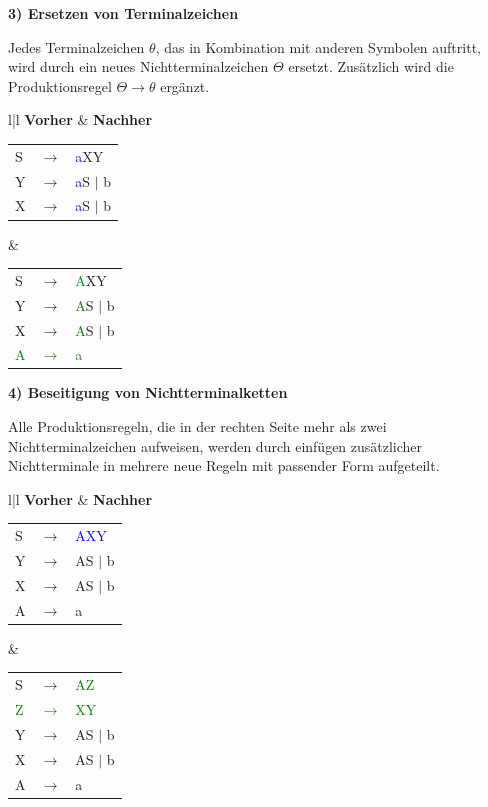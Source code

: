 \begin{teile}
	\textbf{3) Ersetzen von Terminalzeichen}

	Jedes Terminalzeichen $\theta$, das in Kombination mit anderen Symbolen auftritt, wird durch ein neues Nichtterminalzeichen $\Theta$ ersetzt. Zusätzlich wird die Produktionsregel $\Theta \rightarrow \theta$ ergänzt.

	\begin{tabular}{l|l}
		\textbf{Vorher} & \textbf{Nachher} \\
		\hline
		\begin{tabular}{lcl}
			S  & $\rightarrow$ & \textcolor{blue}{a}XY                 \\
			Y  & $\rightarrow$ & \textcolor{blue}{a}S $\mid$ b         \\
			X  & $\rightarrow$ & \textcolor{blue}{a}S $\mid$ b         \\ 
		\end{tabular} &
		\begin{tabular}{lcl}
			S  & $\rightarrow$ & \textcolor{green}{A}XY                 \\
			Y  & $\rightarrow$ & \textcolor{green}{A}S $\mid$ b         \\
			X  & $\rightarrow$ & \textcolor{green}{A}S $\mid$ b         \\ 
			\textcolor{green}{A}  & \textcolor{green}{$\rightarrow$} & \textcolor{green}{a} \\
		\end{tabular}
	\end{tabular}
	
	\newpage 
	\textbf{4) Beseitigung von Nichtterminalketten} 
		
	Alle Produktionsregeln, die in der rechten Seite mehr als zwei Nichtterminalzeichen aufweisen, werden durch einfügen zusätzlicher Nichtterminale in mehrere neue Regeln mit passender Form aufgeteilt.
	
	\begin{tabular}{l|l}
		\textbf{Vorher} & \textbf{Nachher} \\
		\hline
		\begin{tabular}{lcl}
			S  & $\rightarrow$ & \textcolor{blue}{AXY} \\
			Y  & $\rightarrow$ & AS $\mid$ b         \\
			X  & $\rightarrow$ & AS $\mid$ b         \\ 
			A  & $\rightarrow$ & a \\
		\end{tabular} &
		\begin{tabular}{lcl}
			S  & $\rightarrow$ & \textcolor{green}{AZ}  \\
			\textcolor{green}{Z}  & \textcolor{green}{$\rightarrow$} & \textcolor{green}{XY} \\
			Y  & $\rightarrow$ & AS $\mid$ b         \\
			X  & $\rightarrow$ & AS $\mid$ b         \\ 
			A  & $\rightarrow$ & a \\
		\end{tabular}
	\end{tabular}
	

\end{teile}
